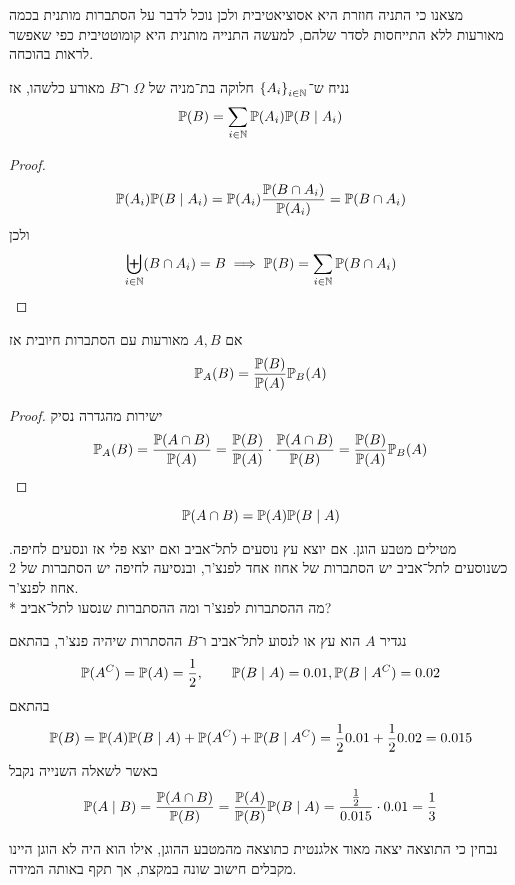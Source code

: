 מצאנו כי התניה חוזרת היא אסוציאטיבית ולכן נוכל לדבר על הסתברות מותנית בכמה מאורעות ללא התייחסות לסדר שלהם, למעשה התנייה מותנית היא קומוטטיבית כפי שאפשר לראות בהוכחה.
\begin{conclusion}
	נניח ש־${\{A_i\}}_{i \in \mathbb{N}}$ חלוקה בת־מניה של $\Omega$ ו־$B$ מאורע כלשהו, אז
	\[
		\mathbb{P}(B) = \sum_{i \in \mathbb{N}} \mathbb{P}(A_i) \mathbb{P}(B \mid A_i)
	\]
\end{conclusion}
\begin{proof}
	\[
		\mathbb{P}(A_i) \mathbb{P}(B \mid A_i) = \mathbb{P}(A_i) \frac{\mathbb{P}(B \cap A_i)}{\mathbb{P}(A_i)} = \mathbb{P}(B \cap A_i)
	\]
	ולכן
	\[
		\biguplus_{i \in \mathbb{N}} (B \cap A_i) = B
		\implies \mathbb{P}(B) = \sum_{i \in \mathbb{N}} \mathbb{P}(B \cap A_i)
	\]
\end{proof}
\begin{lemma}
	אם $A, B$ מאורעות עם הסתברות חיובית אז
	\[
		\mathbb{P}_A(B) = \frac{\mathbb{P}(B)}{\mathbb{P}(A)} \mathbb{P}_B(A)
	\]
\end{lemma}
\begin{proof}
	ישירות מהגדרה נסיק
	\[
		\mathbb{P}_A(B)
		= \frac{\mathbb{P}(A \cap B)}{\mathbb{P}(A)}
		= \frac{\mathbb{P}(B)}{\mathbb{P}(A)} \cdot \frac{\mathbb{P}(A \cap B)}{\mathbb{P}(B)}
		= \frac{\mathbb{P}(B)}{\mathbb{P}(A)} \mathbb{P}_B(A)
	\]
\end{proof}
\begin{conclusion}
	\[
		\mathbb{P}(A \cap B) = \mathbb{P}(A) \mathbb{P}(B \mid A)
	\]
\end{conclusion}
\begin{exercise}
	מטילים מטבע הוגן. אם יוצא עץ נוסעים לתל־אביב ואם יוצא פלי אז ונסעים לחיפה.
	כשנוסעים לתל־אביב יש הסתברות של אחוז אחד לפנצ'ר, ובנסיעה לחיפה יש הסתברות של 2 אחוז לפנצ'ר. \\*
	מה ההסתברות לפנצ'ר ומה ההסתברות שנסעו לתל־אביב?
\end{exercise}
\begin{solution}
	נגדיר $A$ הוא עץ או לנסוע לתל־אביב ו־$B$ ההסתרות שיהיה פנצ'ר, בהתאם
	\[
		\mathbb{P}(A^C) = \mathbb{P}(A) = \frac{1}{2},
		\qquad
		\mathbb{P}(B \mid A) = 0.01,
		\mathbb{P}(B \mid A^C) = 0.02
	\]
	בהתאם
	\[
		\mathbb{P}(B) = \mathbb{P}(A) \mathbb{P}(B \mid A) + \mathbb{P}(A^C) + \mathbb{P}(B \mid A^C)
		= \frac{1}{2} 0.01 + \frac{1}{2} 0.02 = 0.015
	\]
	באשר לשאלה השנייה נקבל
	\[
		\mathbb{P}(A \mid B) = \frac{\mathbb{P}(A \cap B)}{\mathbb{P}(B)} = \frac{\mathbb{P}(A)}{\mathbb{P}(B)} \mathbb{P}(B \mid A) = \frac{\frac{1}{2}}{0.015} \cdot 0.01 = \frac{1}{3}
	\]
\end{solution}
נבחין כי התוצאה יצאה מאוד אלגנטית כתוצאה מהמטבע ההוגן, אילו הוא היה לא הוגן היינו מקבלים חישוב שונה במקצת, אך תקף באותה המידה.
